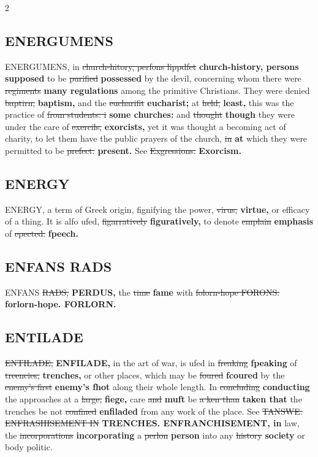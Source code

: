 \documentclass[10pt]{article}
\begin{document}
\begin{multicols}{2}
\subsection*{ENERGUMENS}
ENERGUMENS, in \sout{church-hitory, perfons lippdfet} \textbf{church-history, persons supposed} to be \sout{purified} \textbf{possessed} by the devil, concerning whom there were \sout{regiments} \textbf{many regulations} among the primitive Christians. They were denied \sout{baptirn,} \textbf{baptism,} and the \sout{eucharifit} \textbf{eucharist;} at \sout{held,} \textbf{least,} this was the practice of \sout{from students: i} \textbf{some churches:} and \sout{thought} \textbf{though} they were under the care of \sout{exercils,} \textbf{exorcists,} yet it was thought a becoming act of charity, to let them have the public prayers of the church, \sout{in} \textbf{at} which they were permitted to be \sout{prefect.} \textbf{present.} See \sout{Exgressions.} \textbf{Exorcism.}

\subsection*{ENERGY}
ENERGY, a term of Greek origin, fignifying the power, \sout{virus,} \textbf{virtue,} or efficacy of a thing. It is alfo ufed, \sout{figarratively} \textbf{figuratively,} to denote \sout{emplain} \textbf{emphasis} of \sout{epected.} \textbf{fpeech.}

\subsection*{ENFANS RADS}
ENFANS \sout{RADS,} \textbf{PERDUS,} the \sout{time} \textbf{fame} with \sout{folorn-hope FORONS.} \textbf{forlorn-hope. FORLORN.}

\subsection*{ENTILADE}
\sout{ENTILADE,} \textbf{ENFILADE,} in the art of war, is ufed in \sout{freaking} \textbf{fpeaking} of \sout{treencies,} \textbf{trenches,} or other places, which may be \sout{foured} \textbf{fcoured} by the \sout{enemy’s first} \textbf{enemy's fhot} along their whole length. In \sout{concluding} \textbf{conducting} the approaches at a \sout{large,} \textbf{fiege,} care \sout{and} \textbf{muft} be \sout{a ken than} \textbf{taken that} the trenches be not \sout{confined} \textbf{enfiladed} from any work of the place. See \sout{TANSWE. ENFRASHISEMENT IN} \textbf{TRENCHES. ENFRANCHISEMENT, in} law, the \sout{incorporations} \textbf{incorporating} a \sout{perlon} \textbf{person} into any \sout{history} \textbf{society} or body politic.


\end{multicols}
\end{document}
